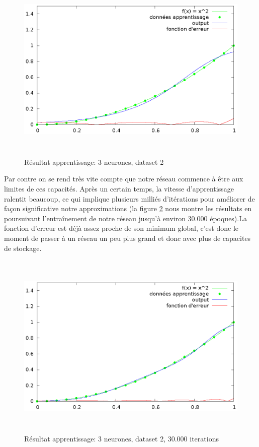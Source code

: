 \documentclass[twoside,openright,a4paper,11pt,french]{article}
\begin{document}
\begin{figure}[ht]
\centering
\includegraphics[width=12cm,height=9cm]{./pics/chartsqtest2.eps}
\caption{Résultat apprentissage: 3 neurones, dataset 2}
\label{fig:chartsqtest2}
\end{figure}

Par contre on se rend très vite compte que notre réseau commence à être aux limites
de ces capacités.
Après un certain temps, la vitesse d'apprentissage ralentit beaucoup, 
ce qui implique plusieurs milliés d'itérations pour améliorer de façon 
significative notre approximations (la figure \ref{fig:chartsqtest3} nous
montre les résultats en poursuivant l'entraînement de notre réseau jusqu'à
environ 30.000 époques).La fonction d'erreur est déjà assez proche de son minimum 
global, c'est donc le moment de passer à un réseau un peu plus grand
et donc avec plus de capacites de stockage.


\begin{figure}[ht]
\centering
\includegraphics[width=12cm,height=9cm]{./pics/chartsqtest3.eps}
\caption{Résultat apprentissage: 3 neurones, dataset 2, 30.000 iterations}
\label{fig:chartsqtest3}
\end{figure}
\end{document}
